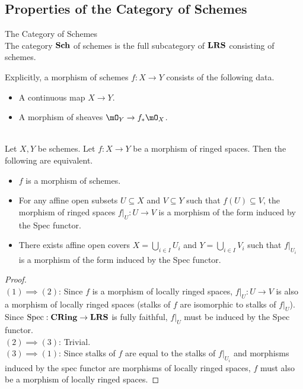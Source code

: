 \documentclass[a4paper]{article}
\begin{document}
\subsection{Properties of the Category of Schemes}
\begin{defn}{The Category of Schemes}{}\\
The category $\bold{Sch}$ of schemes is the full subcategory of $\bold{LRS}$ consisting of schemes. 
\end{defn}

Explicitly, a morphism of schemes $f:X\to Y$ consists of the following data. 
\begin{itemize}
\item A continuous map $X\to Y$. 
\item A morphism of sheaves $\mO_Y\to f_\ast\mO_X$. 
\end{itemize}

\begin{prp}{}{}\\
Let $X,Y$ be schemes. Let $f:X\to Y$ be a morphism of ringed spaces. Then the following are equivalent. 
\begin{itemize}
\item $f$ is a morphism of schemes. 
\item For any affine open subsets $U\subseteq X$ and $V\subseteq Y$ such that $f(U)\subseteq V$, the morphism of ringed spaces $f|_U:U\to V$ is a morphism of the form induced by the Spec functor. 
\item There exists affine open covers $X=\bigcup_{i\in I}U_i$ and $Y=\bigcup_{i\in I}V_i$ such that $f|_{U_i}$ is a morphism of the form induced by the Spec functor. 
\end{itemize}
\begin{proof}\\
$(1)\implies(2)$: Since $f$ is a morphism of locally ringed spaces, $f|_U:U\to V$ is also a morphism of locally ringed spaces (stalks of $f$ are isomorphic to stalks of $f|_U$). Since $\text{Spec}:\bold{CRing}\to\bold{LRS}$ is fully faithful, $f|_U$ must be induced by the Spec functor. \\

$(2)\implies(3)$: Trivial. \\

$(3)\implies(1)$: Since stalks of $f$ are equal to the stalks of $f|_{U_i}$ and morphisms induced by the spec functor are morphisms of locally ringed spaces, $f$ must also be a morphism of locally ringed spaces. 
\end{proof}
\end{prp}
\end{document}
